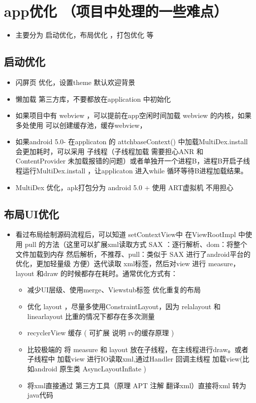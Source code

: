 \documentclass[9pt, b5paper]{article}
\begin{document}
\section{app优化 （项目中处理的一些难点）}
\label{sec-2}
\begin{itemize}
\item 主要分为 启动优化，布局优化 ，打包优化 等
\end{itemize}
\subsection{启动优化}
\label{sec-2-1}
\begin{itemize}
\item 闪屏页 优化，设置theme 默认欢迎背景
\item 懒加载 第三方库，不要都放在application 中初始化
\item 如果项目中有 webview ，可以提前在app空闲时间加载 webview 的内核，如果多处使用 可以创建缓存池，缓存webview，
\item 如果android 5.0- 在applicaton 的 attchbaseContext() 中加载MultiDex.install 会更加耗时，可以采用 子线程（子线程加载 需要担心ANR 和ContentProvider 未加载报错的问题）或者单独开一个进程B，进程B开启子线程运行MultiDex.install ，让applicaton 进入while 循环等待B进程加载结果。
\item MultiDex 优化，apk打包分为 android 5.0 + 使用 ART虚拟机 不用担心
\end{itemize}
\subsection{布局UI优化}
\label{sec-2-2}
\begin{itemize}
\item 看过布局绘制源码流程后，可以知道 setContextView中 在ViewRootImpl 中使用 pull 的方法（这里可以扩展xml读取方式 SAX ：逐行解析、dom：将整个文件加载到内存 然后解析，不推荐、pull：类似于 SAX 进行了android平台的优化，更加轻量级 方便）迭代读取 xml标签，然后对view 进行 measure，layout 和draw 的时候都存在耗时。通常优化方式有：
\begin{itemize}
\item 减少UI层级、使用merge、Viewstub标签 优化重复的布局
\item 优化 layout ，尽量多使用ConstraintLayout，因为 relalayout 和 linearlayout 比重的情况下都存在多次测量
\item recyclerView 缓存 ( 可扩展 说明 rv的缓存原理 )
\item 比较极端的 将 measure 和 layout 放在子线程，在主线程进行draw。或者 子线程中 加载view 进行IO读取xml,通过Handler 回调主线程 加载view(比如android 原生类 AsyncLayoutInflate )
\item 将xml直接通过 第三方工具（原理 APT 注解 翻译xml）直接将xml 转为 java代码
\end{itemize}
\end{itemize}
\end{document}
